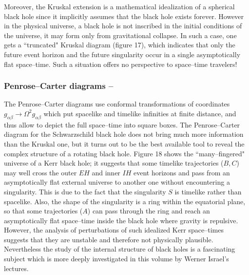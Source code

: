 \documentclass{lamuphys}
\begin{document}
Moreover, the Kruskal extension is a mathematical idealization of a 
spherical black hole since it implicitly assumes that the black hole 
exists forever. However in the physical universe, a black hole is not inscribed
 in the initial conditions of the universe, it may form only from gravitational collapse. 
In such a case, one gets a ``truncated" Kruskal diagram (figure 17), 
which indicates that only the future event horizon and the future 
singularity occur in a single asymptotically flat space--time. Such 
a situation offers no perspective to space--time travelers!
 

\subsubsection{Penrose--Carter diagrams --}

The Penrose--Carter diagrams use conformal transformations of 
coordinates $g_{\alpha \beta} \to \Omega^{2}g_{\alpha \beta}$ which 
put spacelike and timelike infinities at finite distance, and thus 
allow to depict the full space--time into square boxes. The 
Penrose--Carter diagram for the Schwarzschild black hole does not 
bring much more information than the Kruskal one, but it turns 
out to be the best available tool to reveal the complex structure of a rotating black hole.
Figure 18 shows the ``many--fingered" universe of a Kerr black hole; 
it suggests that some timelike trajectories ($B,C$) may well cross the 
outer $EH$
and inner $IH$
event horizons and pass from an asymptotically flat external universe to 
another one without encountering a singularity. This is due to the fact 
that the singularity $S$ is timelike 
rather than spacelike. Also, the shape of the singularity is a ring 
within the equatorial plane, so that some trajectories ($A$) can pass 
through the ring and reach an asymptotically flat space--time inside 
the black hole where gravity is repulsive.
However, the analysis of perturbations of such idealized Kerr 
space--times suggests that they are unstable and therefore not physically plausible. 
Nevertheless the study of the  internal structure of black holes is a 
fascinating subject which is more deeply investigated in this 
volume by Werner Israel's lectures.
\end{document}

